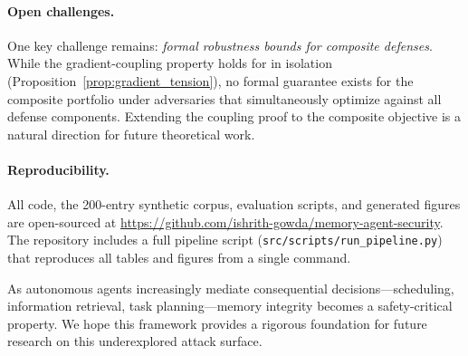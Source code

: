 \paragraph{Open challenges.}
One key challenge remains: \emph{formal robustness bounds for composite defenses}.
While the gradient-coupling property holds for \sad{} in isolation
(Proposition~\ref{prop:gradient_tension}), no formal guarantee exists for the
composite portfolio under adversaries that simultaneously optimize against all
defense components.  Extending the coupling proof to the composite objective
is a natural direction for future theoretical work.

\paragraph{Reproducibility.}
All code, the 200-entry synthetic corpus, evaluation scripts, and generated figures
are open-sourced at \url{https://github.com/ishrith-gowda/memory-agent-security}.
The repository includes a full pipeline script (\texttt{src/scripts/run\_pipeline.py})
that reproduces all tables and figures from a single command.

As autonomous agents increasingly mediate consequential decisions---scheduling,
information retrieval, task planning---memory integrity becomes a safety-critical
property.  We hope this framework provides a rigorous foundation for future research
on this underexplored attack surface.
